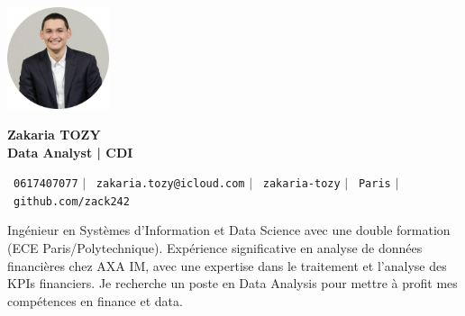 \documentclass[11pt,a4paper]{article}
\begin{document}
\begin{flushleft}
  \begin{minipage}[c]{0.2\textwidth}
    \includegraphics[width=3cm]{images/profilpicture.png}
  \end{minipage}%
  \begin{minipage}[c]{0.8\textwidth}
    {\Huge \textbf{Zakaria TOZY}} \\[5pt]
    {\Large \textbf{Data Analyst | CDI}}
  \end{minipage}
\end{flushleft}

\vspace{-5pt}

\begin{center}
    \small \faPhone\ \texttt{0617407077} \hspace{1pt} $|$
    \hspace{1pt} \faEnvelope\ \texttt{zakaria.tozy@icloud.com} \hspace{1pt} $|$
    \hspace{1pt} \faLinkedin\ \texttt{zakaria-tozy} \hspace{1pt} $|$
    \hspace{1pt} \faMapMarker\ \texttt{Paris} \hspace{1pt} $|$
    \hspace{1pt} \faGithub\ \texttt{github.com/zack242} \\ \vspace{0pt}
\end{center}

\begin{itemize}[leftmargin=0in, label={}]
\footnotesize{\item{
Ingénieur en Systèmes d'Information et Data Science avec une double formation (ECE Paris/Polytechnique). Expérience significative en analyse de données financières chez AXA IM, avec une expertise dans le traitement et l'analyse des KPIs financiers. Je recherche un poste en Data Analysis pour mettre à profit mes compétences en finance et data.
}}
\end{itemize}
\end{document}
